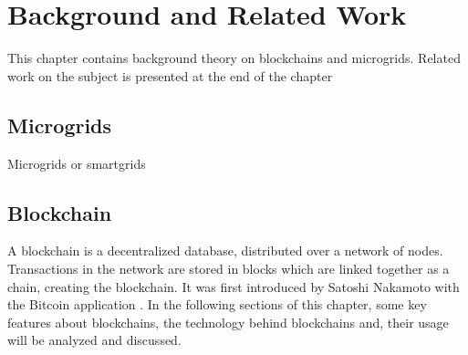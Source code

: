 \chapter{Background and Related Work}
This chapter contains background theory on blockchains and microgrids. Related work on the subject is presented at the end of the chapter
\section{Microgrids}
Microgrids or smartgrids





\section{Blockchain}
A blockchain is a decentralized database, distributed over a network of nodes. Transactions in the network are stored in blocks which are linked together as a chain, creating the blockchain. It was first introduced by Satoshi Nakamoto with the Bitcoin application \cite{Nakamoto_bitcoin}.
In the following sections of this chapter, some key features about blockchains, the technology behind blockchains and, their usage will be analyzed and discussed. 

